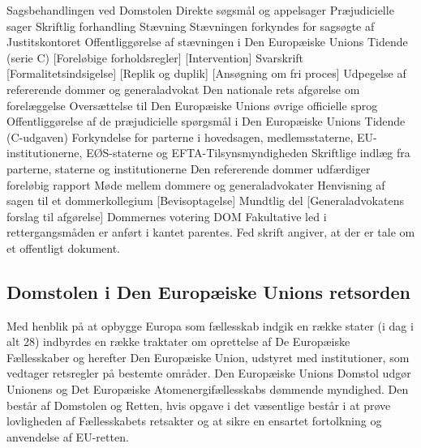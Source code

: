 \documentclass[]{book}
\begin{document}
Sagsbehandlingen ved Domstolen
Direkte søgsmål og appelsager Præjudicielle sager
Skriftlig forhandling
Stævning
Stævningen forkyndes for sagsøgte af Justitskontoret
Offentliggørelse af stævningen i Den Europæiske Unions Tidende (serie C)
{[}Foreløbige forholdsregler{]}
{[}Intervention{]}
Svarskrift
{[}Formalitetsindsigelse{]}
{[}Replik og duplik{]} {[}Ansøgning om fri proces{]}
Udpegelse af refererende dommer og generaladvokat Den nationale rets afgørelse om forelæggelse
Oversættelse til Den Europæiske Unions øvrige officielle sprog
Offentliggørelse af de præjudicielle spørgsmål i
Den Europæiske Unions Tidende (C-udgaven)
Forkyndelse for parterne i hovedsagen, medlemsstaterne,
EU-institutionerne, EØS-staterne og EFTA-Tilsynsmyndigheden
Skriftlige indlæg fra parterne, staterne og institutionerne
Den refererende dommer udfærdiger foreløbig rapport
Møde mellem dommere og generaladvokater
Henvisning af sagen til et dommerkollegium
{[}Bevisoptagelse{]}
Mundtlig del
{[}Generaladvokatens forslag til afgørelse{]}
Dommernes votering
DOM
Fakultative led i rettergangsmåden er anført i kantet parentes.
Fed skrift angiver, at der er tale om et offentligt dokument.

\hypertarget{domstolen-i-den-europiske-unions-retsorden}{%
\subsection{Domstolen i Den Europæiske Unions retsorden}\label{domstolen-i-den-europiske-unions-retsorden}}

Med henblik på at opbygge Europa som fællesskab indgik en række stater (i dag i alt 28) indbyrdes en række traktater om oprettelse af De Europæiske Fællesskaber og herefter Den Europæiske Union, udstyret med institutioner, som vedtager retsregler på bestemte områder.
Den Europæiske Unions Domstol udgør Unionens og Det Europæiske Atomenergifællesskabs dømmende myndighed. Den består af Domstolen og Retten, hvis opgave i det væsentlige består i at prøve lovligheden af Fællesskabets retsakter og at sikre en ensartet fortolkning og anvendelse af EU-retten.
\end{document}
